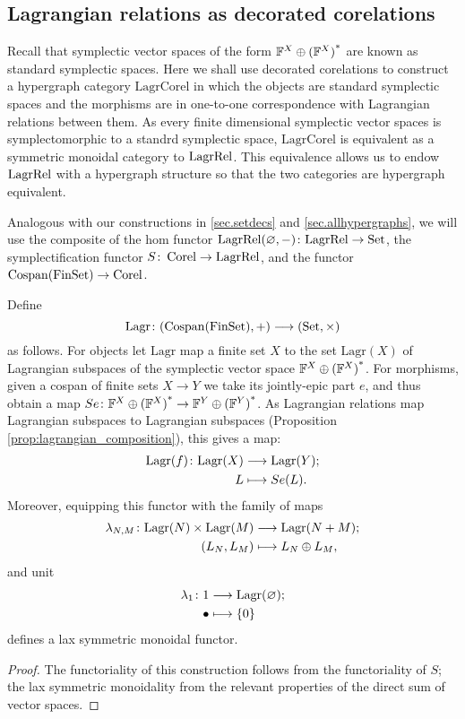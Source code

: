 \subsection{Lagrangian relations as decorated corelations}
\label{ssec.lagrrelascorel}
Recall that symplectic vector spaces of the form ${{\mathbb F}^{X} \oplus {({\mathbb F}^{X})}^\ast}$ are known as
standard symplectic spaces. Here we shall use decorated corelations to
construct a hypergraph category $\mathrm{LagrCorel}$ in which the objects are standard
symplectic spaces and the morphisms are in one-to-one correspondence with
Lagrangian relations between them.  As every finite dimensional symplectic
vector spaces is symplectomorphic to a standrd symplectic space,
$\mathrm{LagrCorel}$ is equivalent as a symmetric monoidal category to
$\mathrm{LagrRel}$. This equivalence allows us to endow $\mathrm{LagrRel}$ with a hypergraph
structure so that the two categories are hypergraph equivalent. 

Analogous with our constructions in \textsection\ref{sec.setdecs} and
\textsection\ref{sec.allhypergraphs}, we will use the composite of the hom
functor $\mathrm{LagrRel}(\varnothing,-){\colon} \mathrm{LagrRel} \to \mathrm{Set}$, the
symplectification functor $S{\colon}\operatorname{{Corel}} \to \mathrm{LagrRel}$, and the functor
$\operatorname{{Cospan}}(\mathrm{FinSet}) \to \operatorname{{Corel}}$.

\begin{proposition}
Define 
\[
  \mathrm{Lagr}{\colon} (\operatorname{{Cospan}}(\mathrm{FinSet}),+) \longrightarrow (\mathrm{Set},\times)
\]
as follows. For objects let $\mathrm{Lagr}$ map a finite set $X$ to the set
$\mathrm{Lagr}(X)$ of Lagrangian subspaces of the symplectic vector space
${{\mathbb F}^{X} \oplus {({\mathbb F}^{X})}^\ast}$.  For morphisms, given a cospan of finite sets $X \to Y$ we
take its jointly-epic part $e$, and thus obtain a map $Se{\colon} {{\mathbb F}^{X} \oplus {({\mathbb F}^{X})}^\ast} \to
{{\mathbb F}^{Y} \oplus {({\mathbb F}^{Y})}^\ast}$. As Lagrangian relations map Lagrangian subspaces to Lagrangian
subspaces (Proposition \ref{prop:lagrangian_composition}), this gives a map: 
\begin{align*}
  \mathrm{Lagr}(f){\colon} \mathrm{Lagr}(X) &\longrightarrow \mathrm{Lagr}(Y); \\
  L &\longmapsto Se(L).
\end{align*}
Moreover, equipping this functor with the family of maps
\begin{align*}
  \lambda_{N,M}{\colon} \mathrm{Lagr}(N) \times \mathrm{Lagr}(M) &\longrightarrow
  \mathrm{Lagr}(N+M);\\
  (L_N,L_M) &\longmapsto L_N \oplus L_M,
\end{align*}
and unit
\begin{align*}
  \lambda_1{\colon} 1 &\longrightarrow \mathrm{Lagr}(\varnothing);\\
  \bullet &\longmapsto \{0\}
\end{align*}
defines a lax symmetric monoidal functor.
\end{proposition}
\begin{proof}
  The functoriality of this construction follows from the functoriality of $S$;
  the lax symmetric monoidality from the relevant properties of the direct sum
  of vector spaces.
\end{proof}

